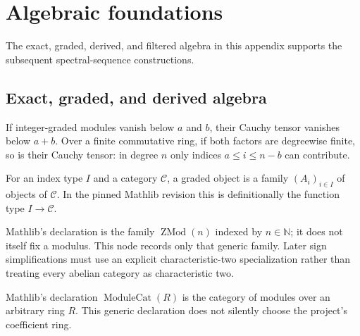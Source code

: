 \section{Algebraic foundations}
\label{chap:algebraic-foundations}

The exact, graded, derived, and filtered algebra in this appendix supports
the subsequent spectral-sequence constructions.

\subsection{Exact, graded, and derived algebra}

\begin{proposition}
  \label{prop:bounded-finite-graded-tensor}
  \leanok
  If integer-graded modules vanish below $a$ and $b$, their Cauchy
  tensor vanishes below $a+b$. Over a finite commutative ring, if both
  factors are degreewise finite, so is their Cauchy tensor: in degree $n$
  only indices $a\le i\le n-b$ can contribute.
\end{proposition}

\begin{definition}
  \label{def:mathlib-graded-object}
  \mathlibok
  For an index type $I$ and a category $\mathcal C$, a graded object is a
  family $(A_i)_{i\in I}$ of objects of $\mathcal C$.  In the pinned Mathlib
  revision this is definitionally the function type $I\to\mathcal C$.
\end{definition}

\begin{definition}
  \label{def:mathlib-f2}
  \mathlibok
  Mathlib's declaration is the family $\operatorname{ZMod}(n)$ indexed by
  $n\in\mathbb N$; it does not itself fix a modulus.  This node records only
  that generic family.  Later sign simplifications must use an explicit
  characteristic-two specialization rather than treating every abelian
  category as characteristic two.
\end{definition}

\begin{definition}
  \label{def:mathlib-f2-module-category}
  \mathlibok
  Mathlib's declaration $\operatorname{ModuleCat}(R)$ is the category of
  modules over an arbitrary ring $R$.  This generic declaration does not
  silently choose the project's coefficient ring.
\end{definition}

